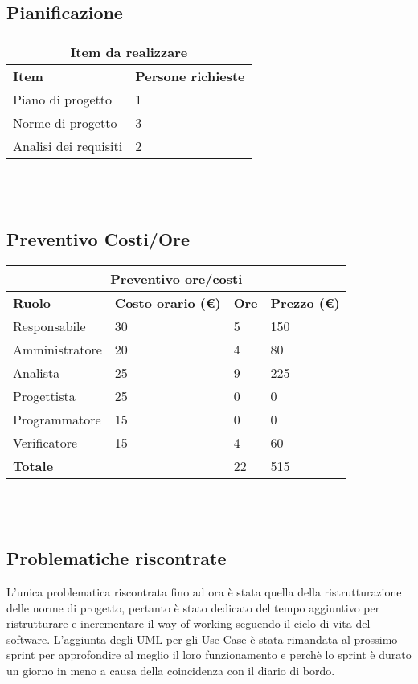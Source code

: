 \documentclass[12pt]{article}
\begin{document}
\subsection{Pianificazione}
\begin{center}
    \begin{tabularx}{\textwidth}{|X|X|}
        \hline
        \multicolumn{2}{|c|}{\textbf{Item da realizzare}}\\
        \hline
        \hline
        \textbf{Item} & \textbf{Persone richieste}\\
        \hline
        Piano di progetto & 1\\
        \hline
        Norme di progetto & 3\\
        \hline
        Analisi dei requisiti & 2 \\
        \hline
    \end{tabularx}\\[8pt]
    \mbox{}\\
\end{center}
\subsection{Preventivo Costi/Ore}
\begin{center}
    \begin{tabularx}{\textwidth}{|X|X|X|X|}
        \hline
        \multicolumn{4}{|c|}{\textbf{Preventivo ore/costi}}\\
        \hline
        \hline
        \textbf{Ruolo} & \textbf{Costo orario (\euro)} & \textbf{Ore} & \textbf{Prezzo (\euro)}\\
        \hline
        Responsabile    & 30 & 5  & 150\\   
        \hline
        Amministratore  & 20 & 4  & 80\\ 
        \hline
        Analista        & 25 & 9  & 225\\ 
        \hline
        Progettista     & 25 & 0  & 0\\
        \hline
        Programmatore   & 15 & 0  & 0\\
        \hline
        Verificatore    & 15 & 4  & 60\\
        \hline
        \hline
        \textbf{Totale} &    & 22 & 515\\
        \hline
    \end{tabularx}\\[8pt]
    \mbox{}\\
\end{center}
\subsection{Problematiche riscontrate}
L'unica problematica riscontrata fino ad ora è stata quella della ristrutturazione delle norme di progetto, pertanto è stato dedicato del tempo aggiuntivo per ristrutturare e incrementare il way of working seguendo il ciclo di vita del software.
L'aggiunta degli UML per gli Use Case è stata rimandata al prossimo sprint per approfondire al meglio il loro funzionamento e perchè lo sprint è durato un giorno in meno a causa della coincidenza con il diario di bordo.
\end{document}

